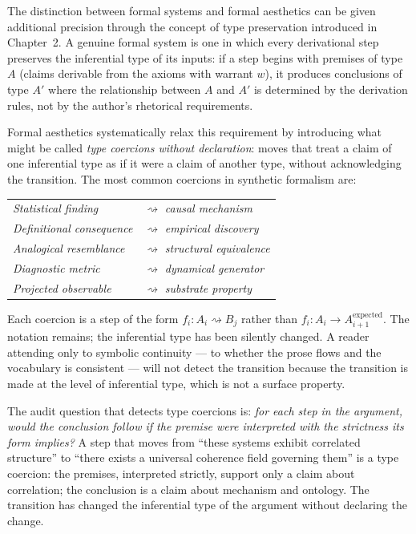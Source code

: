 \documentclass[12pt, openright, twoside]{book}
\begin{document}
\begin{technicalnote}[title={Technical Note: Type Preservation and Inferential Integrity}]

The distinction between formal systems and formal aesthetics can be given additional
precision through the concept of type preservation introduced in Chapter~2. A genuine
formal system is one in which every derivational step preserves the inferential type
of its inputs: if a step begins with premises of type $A$ (claims derivable from
the axioms with warrant $w$), it produces conclusions of type $A'$ where the
relationship between $A$ and $A'$ is determined by the derivation rules, not by
the author's rhetorical requirements.

Formal aesthetics systematically relax this requirement by introducing what might
be called \emph{type coercions without declaration}: moves that treat a claim of
one inferential type as if it were a claim of another type, without acknowledging
the transition. The most common coercions in synthetic formalism are:

\medskip
\begin{tabular}{@{}ll@{}}
\textit{Statistical finding} & $\rightsquigarrow$ \textit{causal mechanism} \\
\textit{Definitional consequence} & $\rightsquigarrow$ \textit{empirical discovery} \\
\textit{Analogical resemblance} & $\rightsquigarrow$ \textit{structural equivalence} \\
\textit{Diagnostic metric} & $\rightsquigarrow$ \textit{dynamical generator} \\
\textit{Projected observable} & $\rightsquigarrow$ \textit{substrate property} \\
\end{tabular}
\medskip

Each coercion is a step of the form $f_i : A_i \rightsquigarrow B_j$ rather than
$f_i : A_i \to A_{i+1}^{\mathrm{expected}}$. The notation remains; the inferential
type has been silently changed. A reader attending only to symbolic continuity ---
to whether the prose flows and the vocabulary is consistent --- will not detect the
transition because the transition is made at the level of inferential type, which is
not a surface property.

The audit question that detects type coercions is: \emph{for each step in the
argument, would the conclusion follow if the premise were interpreted with the
strictness its form implies?} A step that moves from ``these systems exhibit
correlated structure'' to ``there exists a universal coherence field governing them''
is a type coercion: the premises, interpreted strictly, support only a claim about
correlation; the conclusion is a claim about mechanism and ontology. The transition
has changed the inferential type of the argument without declaring the change.

\end{technicalnote}
\end{document}
